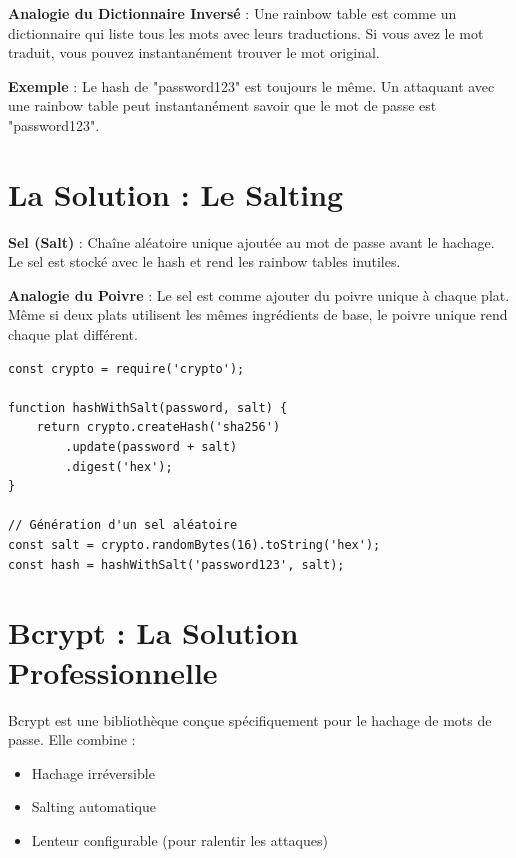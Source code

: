 \begin{analogybox}
    \textbf{Analogie du Dictionnaire Inversé} : Une rainbow table est comme un dictionnaire qui liste tous les mots avec leurs traductions. Si vous avez le mot traduit, vous pouvez instantanément trouver le mot original.
\end{analogybox}

\textbf{Exemple} : Le hash de "password123" est toujours le même. Un attaquant avec une rainbow table peut instantanément savoir que le mot de passe est "password123".

\section{La Solution : Le Salting}

\begin{definitionbox}
    \textbf{Sel (Salt)} : Chaîne aléatoire unique ajoutée au mot de passe avant le hachage. Le sel est stocké avec le hash et rend les rainbow tables inutiles.
\end{definitionbox}

\begin{analogybox}
    \textbf{Analogie du Poivre} : Le sel est comme ajouter du poivre unique à chaque plat. Même si deux plats utilisent les mêmes ingrédients de base, le poivre unique rend chaque plat différent.
\end{analogybox}

\begin{lstlisting}[style=javascript, caption=Hachage avec sel (manuel - DÉCONSEILLÉ)]
const crypto = require('crypto');

function hashWithSalt(password, salt) {
    return crypto.createHash('sha256')
        .update(password + salt)
        .digest('hex');
}

// Génération d'un sel aléatoire
const salt = crypto.randomBytes(16).toString('hex');
const hash = hashWithSalt('password123', salt);
\end{lstlisting}

\section{Bcrypt : La Solution Professionnelle}

Bcrypt est une bibliothèque conçue spécifiquement pour le hachage de mots de passe. Elle combine :
\begin{itemize}
    \item Hachage irréversible
    \item Salting automatique
    \item Lenteur configurable (pour ralentir les attaques)
\end{itemize}

